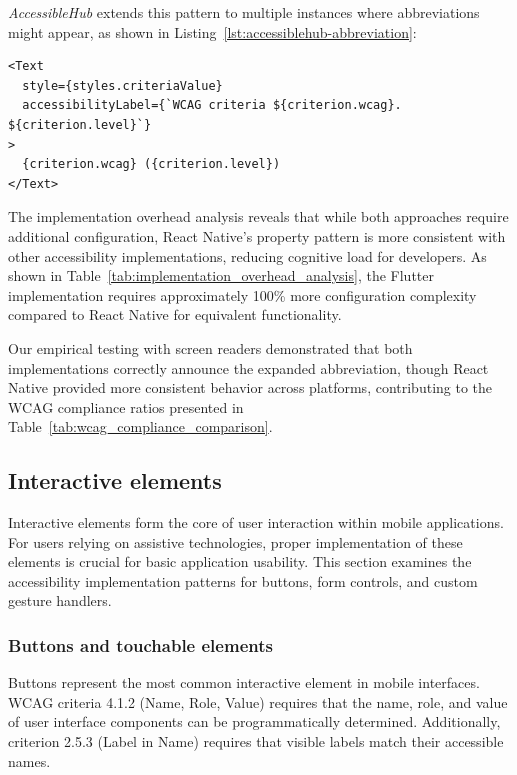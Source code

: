 \textit{AccessibleHub} extends this pattern to multiple instances where abbreviations might appear, as shown in Listing~\ref{lst:accessiblehub-abbreviation}:

\begin{lstlisting}[style=ReactNativeStyle, caption=Enhanced abbreviation handling in \textit{AccessibleHub}, label=lst:accessiblehub-abbreviation]
<Text
  style={styles.criteriaValue}
  accessibilityLabel={`WCAG criteria ${criterion.wcag}. ${criterion.level}`}
>
  {criterion.wcag} ({criterion.level})
</Text>
\end{lstlisting}

\pagebreak

The implementation overhead analysis reveals that while both approaches require additional configuration, React Native's property pattern is more consistent with other accessibility implementations, reducing cognitive load for developers. As shown in Table~\ref{tab:implementation_overhead_analysis}, the Flutter implementation requires approximately 100\% more configuration complexity compared to React Native for equivalent functionality.

Our empirical testing with screen readers demonstrated that both implementations correctly announce the expanded abbreviation, though React Native provided more consistent behavior across platforms, contributing to the WCAG compliance ratios presented in Table~\ref{tab:wcag_compliance_comparison}.

\subsection{Interactive elements}
\label{subsec:interactive-elements}

Interactive elements form the core of user interaction within mobile applications. For users relying on assistive technologies, proper implementation of these elements is crucial for basic application usability. This section examines the accessibility implementation patterns for buttons, form controls, and custom gesture handlers.

\subsubsection{Buttons and touchable elements}
\label{subsubsec:buttons-implementation}

Buttons represent the most common interactive element in mobile interfaces. WCAG criteria 4.1.2 (Name, Role, Value) requires that the name, role, and value of user interface components can be programmatically determined. Additionally, criterion 2.5.3 (Label in Name) requires that visible labels match their accessible names.

